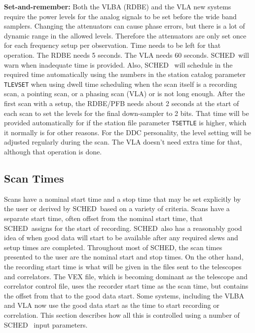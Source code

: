 \documentclass{report}
\newcommand{\sched}{{\sc SCHED}}
\newcommand{\schedb}{{\sc SCHED~}}
\begin{document}
\begin{list}{}{\parsep .5em  \itemsep .5em }
\item{\bf Set-and-remember:} Both the VLBA (RDBE) and the VLA new
systems require the power levels for the analog signals to be set
before the wide band samplers.  Changing the attenuators can cause
phase errors, but there is a lot of dynamic range in the allowed
levels.  Therefore the attenuators are only set once for each
frequency setup per observation.  Time needs to be left for that
operation.  The RDBE needs 5 seconds.  The VLA needs 60 seconds.
\schedb will warn when inadequate time is provided.  Also, \schedb
will schedule in the required time automatically using the numbers in
the station catalog parameter {\tt TLEVSET} when using dwell time
scheduling when the scan itself is a recording scan, a pointing scan,
or a phasing scan (VLA) or is not long enough.  After the first scan
with a setup, the RDBE/PFB needs about 2 seconds at the start of each
scan to set the levels for the final down-sampler to 2 bits.  That
time will be provided automatically for if the station file parameter
{\tt TSETTLE} is higher, which it normally is for other reasons.  For
the DDC personality, the level setting will be adjusted regularly
during the scan.  The VLA doesn't need extra time for that, although
that operation is done.


\end{list}



\subsection{\label{SSEC:SCANTIMES}Scan Times}

Scans have a nominal start time and a stop time that may be set
explicitly by the user or derived by \schedb based on a variety of
criteria.  Scans have a separate start time, often offset from the
nominal start time, that \schedb assigns for the start of recording.
\schedb also has a reasonably good idea of when good data will start
to be available after any required slews and setup times are
completed.  Throughout most of \sched, the scan times presented to the
user are the nominal start and stop times.  On the other hand, the
recording start time is what will be given in the files sent to the
telescopes and correlators.  The VEX file, which is becoming dominant
as the telescope and correlator control file, uses the recorder start
time as the scan time, but contains the offset from that to the good
data start.  Some systems, including the VLBA and VLA now use the good
data start as the time to start recording or correlation.  This
section describes how all this is controlled using a number of \schedb
input parameters.
\end{document}
